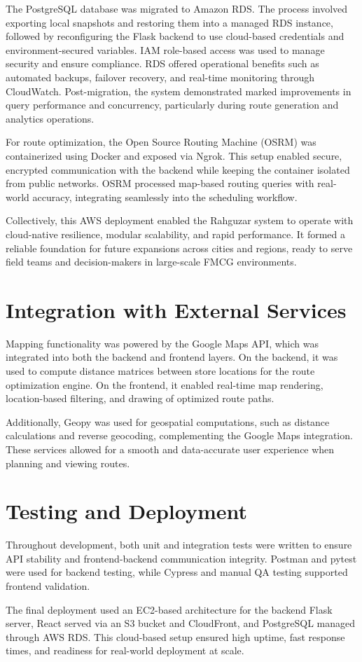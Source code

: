 The PostgreSQL database was migrated to Amazon RDS. The process involved exporting local snapshots and restoring them into a managed RDS instance, followed by reconfiguring the Flask backend to use cloud-based credentials and environment-secured variables. IAM role-based access was used to manage security and ensure compliance. RDS offered operational benefits such as automated backups, failover recovery, and real-time monitoring through CloudWatch. Post-migration, the system demonstrated marked improvements in query performance and concurrency, particularly during route generation and analytics operations.

For route optimization, the Open Source Routing Machine (OSRM) was containerized using Docker and exposed via Ngrok. This setup enabled secure, encrypted communication with the backend while keeping the container isolated from public networks. OSRM processed map-based routing queries with real-world accuracy, integrating seamlessly into the scheduling workflow.

Collectively, this AWS deployment enabled the Rahguzar system to operate with cloud-native resilience, modular scalability, and rapid performance. It formed a reliable foundation for future expansions across cities and regions, ready to serve field teams and decision-makers in large-scale FMCG environments.
\section{Integration with External Services}
Mapping functionality was powered by the Google Maps API, which was integrated into both the backend and frontend layers. On the backend, it was used to compute distance matrices between store locations for the route optimization engine. On the frontend, it enabled real-time map rendering, location-based filtering, and drawing of optimized route paths.

Additionally, Geopy was used for geospatial computations, such as distance calculations and reverse geocoding, complementing the Google Maps integration. These services allowed for a smooth and data-accurate user experience when planning and viewing routes.

\section{Testing and Deployment}
Throughout development, both unit and integration tests were written to ensure API stability and frontend-backend communication integrity. Postman and pytest were used for backend testing, while Cypress and manual QA testing supported frontend validation.

The final deployment used an EC2-based architecture for the backend Flask server, React served via an S3 bucket and CloudFront, and PostgreSQL managed through AWS RDS. This cloud-based setup ensured high uptime, fast response times, and readiness for real-world deployment at scale.